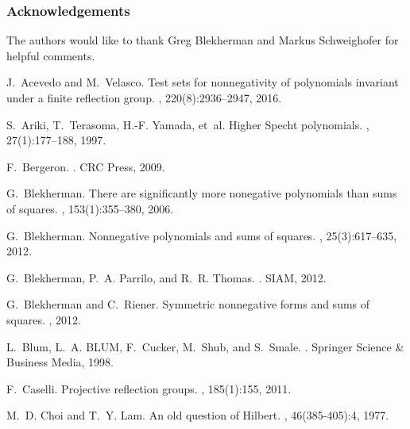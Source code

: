 \documentclass[11pt,a4paper]{amsart}
\numberwithin{equation}{section}
\theoremstyle{definition}
\numberwithin{thm}{section}
\theoremstyle{break}
\numberwithin{subcase}{case}
\begin{document}
\subsubsection*{Acknowledgements} The authors would like to thank Greg Blekherman and Markus Schweighofer for helpful comments.  


\begin{thebibliography}{10}

J.~Acevedo and M.~Velasco.
\newblock Test sets for nonnegativity of polynomials invariant under a finite reflection group.
, 220(8):2936--2947, 2016.

S.~Ariki, T.~Terasoma, H.-F. Yamada, et~al.
\newblock Higher Specht polynomials.
, 27(1):177--188, 1997.

F.~Bergeron.
.
\newblock CRC Press, 2009.

G.~Blekherman.
\newblock There are significantly more nonegative polynomials than sums of
  squares.
, 153(1):355--380, 2006.

G.~Blekherman.
\newblock Nonnegative polynomials and sums of squares.
, 25(3):617--635,
  2012.

G.~Blekherman, P.~A. Parrilo, and R.~R. Thomas.
.
\newblock SIAM, 2012.

G.~Blekherman and C.~Riener.
\newblock Symmetric nonnegative forms and sums of squares.
, 2012.

L.~Blum, L.~A. BLUM, F.~Cucker, M.~Shub, and S.~Smale.
.
\newblock Springer Science \& Business Media, 1998.

F.~Caselli.
\newblock Projective reflection groups.
, 185(1):155, 2011.

M.~D. Choi and T.~Y. Lam.
\newblock An old question of Hilbert.
, 46(385-405):4,
  1977.


\end{thebibliography}
\end{document}
